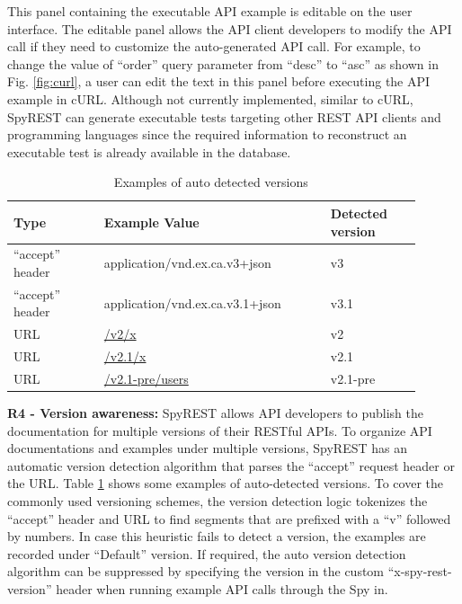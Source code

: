 \documentclass[conference]{IEEEtran}
\begin{document}
This panel containing the executable API example is editable on the user interface. The editable panel allows the API client developers to modify the API call if they need to customize the auto-generated API call. For example, to change the value of ``order'' query parameter from ``desc'' to ``asc''  as shown in Fig. \ref{fig:curl}, a user can edit the text in this panel before executing the API example in cURL. Although not currently implemented, similar to cURL, SpyREST can generate executable tests targeting other REST API clients and programming languages since the required information to reconstruct an executable test is already available in the database.

\begin{table}[!tbh]
  \caption{Examples of auto detected versions}
  \begin{tabular}{|p{0.2\linewidth}|p{0.5\linewidth}|p{0.2\linewidth}|}
    \hline
    Type & Example Value & Detected version\\
    \hline
    ``accept'' header & application/vnd.ex.ca.v3+json & v3\\
    \hline
    ``accept'' header & application/vnd.ex.ca.v3.1+json & v3.1\\
    \hline
    URL & \url{/v2/x} & v2\\
    \hline
    URL & \url{/v2.1/x} & v2.1\\
    \hline
    URL & \url{/v2.1-pre/users} & v2.1-pre\\
    \hline
  \end{tabular}
  \label{table:versions}
\end{table}

\textbf{R4 - Version awareness:} SpyREST allows API developers to publish the documentation for multiple versions of their RESTful APIs. To organize API documentations and examples under multiple versions, SpyREST has an automatic version detection algorithm that parses the ``accept'' request header or the URL. Table \ref{table:versions} shows some examples of auto-detected versions. To cover the commonly used versioning schemes, the version detection logic tokenizes the ``accept'' header and URL to find segments that are prefixed with a ``v'' followed by numbers. In case this heuristic fails to detect a version, the examples are recorded under ``Default'' version. If required, the auto version detection algorithm can be suppressed by specifying the version in the custom ``x-spy-rest-version'' header when running example API calls through the Spy in.
\end{document}
